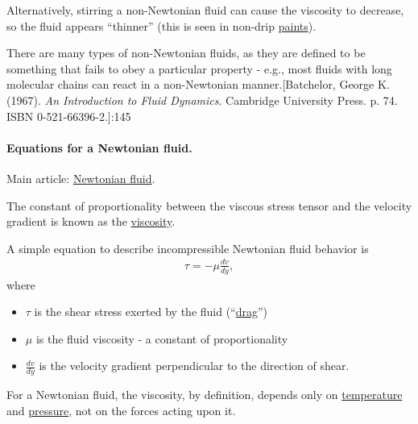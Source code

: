 \documentclass{article}
\begin{document}
Alternatively, stirring a non-Newtonian fluid can cause the viscosity to decrease, so the fluid appears ``thinner'' (this is seen in non-drip \href{https://en.wikipedia.org/wiki/Paint}{paints}).

There are many types of non-Newtonian fluids, as they are defined to be something that fails to obey a particular property - e.g., most fluids with long molecular chains can react in a non-Newtonian manner.[Batchelor, George K. (1967). \textit{An Introduction to Fluid Dynamics}. Cambridge University Press. p. 74. ISBN 0-521-66396-2.]:145

\paragraph{Equations for a Newtonian fluid.}
Main article: \href{https://en.wikipedia.org/wiki/Newtonian_fluid}{Newtonian fluid}.

%
The constant of proportionality between the viscous stress tensor and the velocity gradient is known as the \href{https://en.wikipedia.org/wiki/Viscosity}{viscosity}.

A simple equation to describe incompressible Newtonian fluid behavior is
\begin{align*}
	\tau = -\mu\frac{dv}{dy},
\end{align*}
where
\begin{itemize}
	\item $\tau$ is the shear stress exerted by the fluid (``\href{https://en.wikipedia.org/wiki/Drag_(physics)}{drag}'')
	\item $\mu$ is the fluid viscosity - a constant of proportionality
	\item $\frac{dv}{dy}$ is the velocity gradient perpendicular to the direction of shear.
\end{itemize}
For a Newtonian fluid, the viscosity, by definition, depends only on \href{https://en.wikipedia.org/wiki/Temperature}{temperature} and \href{https://en.wikipedia.org/wiki/Pressure}{pressure}, not on the forces acting upon it.
\end{document}
